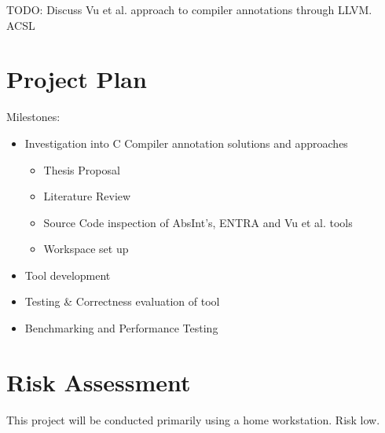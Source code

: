 \documentclass[twocolumn]{article}
\begin{document}
TODO: Discuss Vu et al. approach to compiler annotations through LLVM. 
ACSL



\section{Project Plan}

Milestones:
\begin{itemize}
    \item Investigation into C Compiler annotation solutions and approaches
    \begin{itemize}
        \item Thesis Proposal
        \item Literature Review
        \item Source Code inspection of AbsInt's, ENTRA and Vu et al. tools
        \item Workspace set up
    \end{itemize}
    \item Tool development
    \item Testing \& Correctness evaluation of tool
    \item Benchmarking and Performance Testing
\end{itemize}

\section{Risk Assessment}
This project will be conducted primarily using a home workstation. Risk low.




\printbibliography
\end{document}
